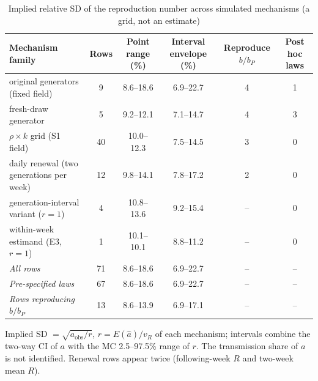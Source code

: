 \begin{table}[!tbp]
\centering
\scriptsize
\setlength{\tabcolsep}{3pt}
\caption{Implied relative SD of the reproduction number across simulated mechanisms (a grid, not an estimate)}
\label{tab:rev_implied_sd}
\begin{tabularx}{\linewidth}{@{}X c c c c c@{}}
\toprule
Mechanism family & Rows & Point range (\%) & Interval envelope (\%) & Reproduce $b/b_P$ & Post hoc laws \\
\midrule
original generators (fixed field) & 9 & 8.6--18.6 & 6.9--22.7 & 4 & 1 \\
fresh-draw generator & 5 & 9.2--12.1 & 7.1--14.7 & 4 & 3 \\
$\rho\times k$ grid (S1 field) & 40 & 10.0--12.3 & 7.5--14.5 & 3 & 0 \\
daily renewal (two generations per week) & 12 & 9.8--14.1 & 7.8--17.2 & 2 & 0 \\
generation-interval variant ($r=1$) & 4 & 10.8--13.6 & 9.2--15.4 & -- & 0 \\
within-week estimand (E3, $r=1$) & 1 & 10.1--10.1 & 8.8--11.2 & -- & 0 \\
\midrule
\emph{All rows} & 71 & 8.6--18.6 & 6.9--22.7 & -- & -- \\
\emph{Pre-specified laws} & 67 & 8.6--18.6 & 6.9--22.7 & -- & -- \\
\emph{Rows reproducing $b/b_P$} & 13 & 8.6--13.9 & 6.9--17.1 & -- & -- \\
\bottomrule
\end{tabularx}
\par\smallskip\parbox{\linewidth}{\scriptsize\linespread{1.15}\selectfont Implied SD $=\sqrt{a_{\mathrm{obs}}/r}$, $r=E(\hat a)/v_R$ of each mechanism; intervals combine the two-way CI of $a$ with the MC 2.5--97.5\% range of $r$. The transmission share of $a$ is not identified. Renewal rows appear twice (following-week $R$ and two-week mean $R$).}
\end{table}
